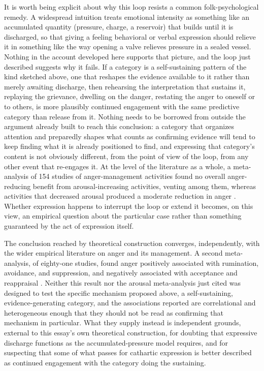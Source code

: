 \documentclass[11pt]{article}
\begin{document}
It is worth being explicit about why this loop resists a common folk-psychological remedy. A widespread intuition treats emotional intensity as something like an accumulated quantity (pressure, charge, a reservoir) that builds until it is discharged, so that giving a feeling behavioral or verbal expression should relieve it in something like the way opening a valve relieves pressure in a sealed vessel. Nothing in the account developed here supports that picture, and the loop just described suggests why it fails. If a category is a self-sustaining pattern of the kind sketched above, one that reshapes the evidence available to it rather than merely awaiting discharge, then rehearsing the interpretation that sustains it, replaying the grievance, dwelling on the danger, restating the anger to oneself or to others, is more plausibly continued engagement with the same predictive category than release from it. Nothing needs to be borrowed from outside the argument already built to reach this conclusion: a category that organizes attention and preparedly shapes what counts as confirming evidence will tend to keep finding what it is already positioned to find, and expressing that category's content is not obviously different, from the point of view of the loop, from any other event that re-engages it. At the level of the literature as a whole, a meta-analysis of 154 studies of anger-management activities found no overall anger-reducing benefit from arousal-increasing activities, venting among them, whereas activities that decreased arousal produced a moderate reduction in anger \citep{Kjaervik2024}. Whether expression happens to interrupt the loop or extend it becomes, on this view, an empirical question about the particular case rather than something guaranteed by the act of expression itself.

The conclusion reached by theoretical construction converges, independently, with the wider empirical literature on anger and its management. A second meta-analysis, of eighty-one studies, found anger positively associated with rumination, avoidance, and suppression, and negatively associated with acceptance and reappraisal \citep{Pop2025}. Neither this result nor the arousal meta-analysis just cited was designed to test the specific mechanism proposed above, a self-sustaining, evidence-generating category, and the associations reported are correlational and heterogeneous enough that they should not be read as confirming that mechanism in particular. What they supply instead is independent grounds, external to this essay's own theoretical construction, for doubting that expressive discharge functions as the accumulated-pressure model requires, and for suspecting that some of what passes for cathartic expression is better described as continued engagement with the category doing the sustaining.
\end{document}

